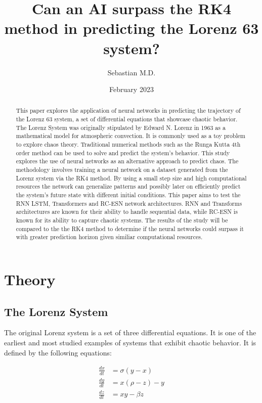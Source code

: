\documentclass[11pt]{article}
\title{Can an AI surpass the RK4 method in predicting the Lorenz 63 system?}
\author{Sebastian M.D.}
\date{February 2023}
\begin{document}
\maketitle

\begin{abstract}
This paper explores the application of neural networks in predicting the trajectory of the Lorenz 63 system, a set of differential equations that showcase chaotic behavior. The Lorenz System was originally stipulated by Edward N. Lorenz in 1963 as a mathematical model for atmospheric convection. It is commonly used as a toy problem to explore chaos theory. Traditional numerical methods such as the Runga Kutta 4th order method can be used to solve and predict the system's behavior. This study explores the use of neural networks as an alternative approach to predict chaos. The methodology involves training a neural network on a dataset generated from the Lorenz system via the RK4 method. By using a small step size and high computational resources the network can generalize patterns and possibly later on efficiently predict the system's future state with different initial conditions. This paper aims to test the RNN LSTM, Transformers and RC-ESN network architectures. RNN and Transforms architectures are known for their ability to handle sequential data, while RC-ESN is known for its ability to capture chaotic systems. The results of the study will be compared to the the RK4 method to determine if the neural networks could surpass it with greater prediction horizon given similiar computational resources.

\end{abstract}

\section{Theory}

\subsection{The Lorenz System}

The original Lorenz system is a set of three differential equations. It is one of the earliest and most studied examples of systems that exhibit chaotic behavior. It is defined by the following equations:

\begin{align}
\frac{dx}{dt} &= \sigma(y - x) \\
\frac{dy}{dt} &= x(\rho - z) - y \\
\frac{dz}{dt} &= xy - \beta z
\end{align}
\end{document}
